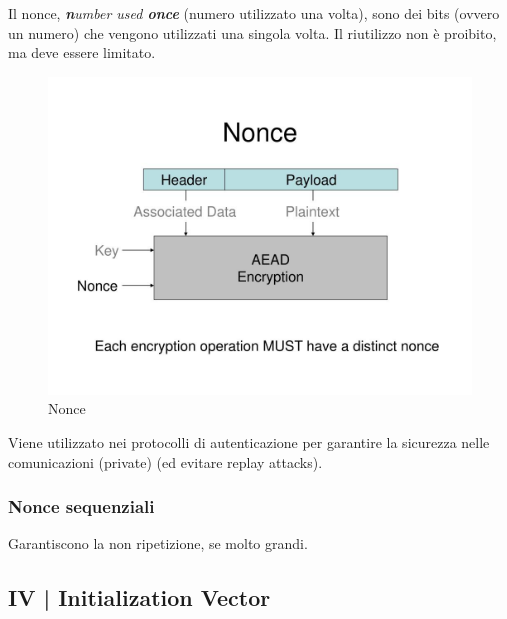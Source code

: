 
\textsf{\small Il nonce, \emph{\textbf{n}umber used \textbf{once}} (numero utilizzato una volta), sono dei bits (ovvero un numero) che vengono utilizzati una singola volta. Il riutilizzo non è proibito, ma deve essere limitato.}

\begin{figure}[H]
	\centering
	\includegraphics[width=.9\textwidth, height=.9\textheight, keepaspectratio]{./images/iv_nonce_salt_pepper/nonce.png}
	\caption{Nonce}
	\label{fig:nonce}
\end{figure}

\textsf{\small Viene utilizzato nei protocolli di autenticazione per garantire la sicurezza nelle comunicazioni (private) (ed evitare replay attacks).} %

\subsubsection{Nonce sequenziali}

\textsf{\small Garantiscono la non ripetizione, se molto grandi.} %


\subsection{IV | Initialization Vector} %


